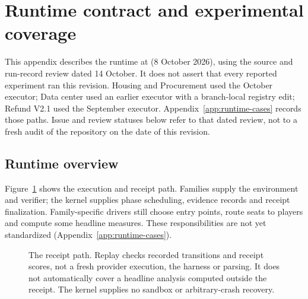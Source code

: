 \section{Runtime contract and experimental coverage}
\label{app:runtime}

This appendix describes the runtime at  (8 October 2026),
using the source and run-record review dated 14 October. It does not
assert that every reported experiment ran this revision. Housing and
Procurement used the October executor; Data center used an earlier
executor with a branch-local registry edit; Refund V2.1 used the
September executor. Appendix~\ref{app:runtime-cases} records those paths.
Issue and review statuses below refer to that dated review, not to a
fresh audit of the repository on the date of this revision.

\subsection{Runtime overview}
\label{app:runtime-overview}

Figure~\ref{fig:runtime} shows the execution and receipt path. Families
supply the environment and verifier; the kernel supplies phase
scheduling, evidence records and receipt finalization. Family-specific
drivers still choose entry points, route seats to players and compute
some headline measures. These responsibilities are not yet standardized
(Appendix~\ref{app:runtime-cases}).

\begin{figure}[htbp]
\centering
{}
\caption{The receipt path. Replay checks recorded transitions and receipt
scores, not a fresh provider execution, the harness or parsing. It does
not automatically cover a headline analysis computed outside the
receipt. The kernel supplies no sandbox or arbitrary-crash recovery.}
\label{fig:runtime}
\end{figure}

